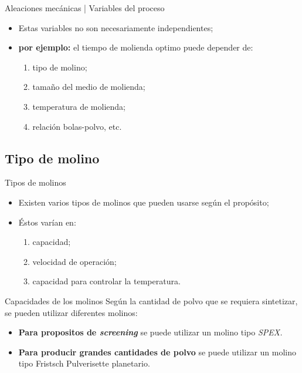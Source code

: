 \documentclass[%
spanish,
progressbar=head,
background=dark,
]{beamer}
\begin{document}
\begin{frame}{Aleaciones mecánicas | Variables del proceso}
    \begin{itemize}
        \item Estas variables no son necesariamente independientes;\\
        \item[] \textbf{por ejemplo:} el tiempo de molienda optimo puede depender de: 
        \begin{enumerate}
            \item tipo de molino;
            \item tamaño del medio de molienda;
            \item temperatura de molienda;
            \item relación bolas-polvo, etc.
        \end{enumerate}
    \end{itemize}
\end{frame}

\subsection{Tipo de molino}

\begin{frame}{Tipos de molinos}
    \begin{itemize}
        \item Existen varios tipos de molinos que pueden usarse según el propósito;
        \item Éstos varían en:
            \begin{enumerate}
                \item capacidad;
                \item velocidad de operación;
                \item capacidad para controlar la temperatura.
            \end{enumerate}
    \end{itemize}
\end{frame}

\begin{frame}{Capacidades de los molinos}
    Según la cantidad de polvo que se requiera sintetizar, se pueden utilizar diferentes molinos:
    \begin{itemize}
        \item \textbf{Para propositos de \emph{screening}} se puede utilizar un molino tipo \emph{SPEX.}
        \item \textbf{Para producir grandes cantidades de polvo} se puede utilizar un molino tipo Fristsch Pulverisette planetario.
    \end{itemize}
\end{frame}
\end{document}

